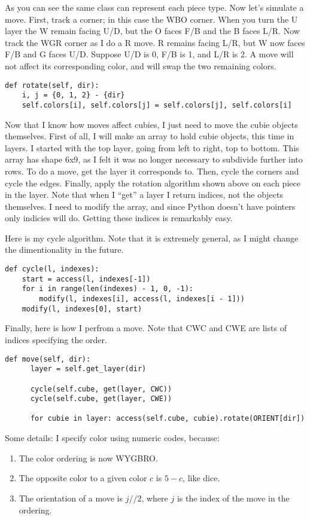 \documentclass[11pt, oneside]{article}
\begin{document}
As you can see the same class can represent each piece type. Now let's simulate a move. First, track a corner; in this case the WBO corner.
When you turn the U layer the W remain facing U/D, but the O faces F/B and the B faces L/R. Now track the WGR corner as I do a R move.
R remains facing L/R, but W now faces F/B and G faces U/D. Suppose U/D is 0, F/B is 1, and L/R is 2. A move will not affect its corresponding color, and will swap the two remaining colors.

\begin{verbatim}
def rotate(self, dir):
    i, j = {0, 1, 2} - {dir}
    self.colors[i], self.colors[j] = self.colors[j], self.colors[i]
\end{verbatim}

Now that I know how moves affect cubies, I just need to move the cubie objects themselves. First of all, I will make an array to hold cubie objects,
this time in layers. I started with the top layer, going from left to right, top to bottom.
This array has shape 6x9, as I felt it was no longer necessary to subdivide further into rows.
To do a move, get the layer it corresponds to. Then, cycle the corners and cycle the edges.
Finally, apply the rotation algorithm shown above on each piece in the layer.
Note that when I ``get'' a layer I return indices, not the objects themselves. I need to modify the array, and since Python doesn't have pointers
only indicies will do. Getting these indices is remarkably easy.

Here is my cycle algorithm. Note that it is extremely general, as I might change the dimentionality in the future.
\begin{verbatim}
def cycle(l, indexes):
    start = access(l, indexes[-1])
    for i in range(len(indexes) - 1, 0, -1):
        modify(l, indexes[i], access(l, indexes[i - 1]))
    modify(l, indexes[0], start)
\end{verbatim}

Finally, here is how I perfrom a move. Note that CWC and CWE are lists of indices specifying the order.
\begin{verbatim}
def move(self, dir):
      layer = self.get_layer(dir)

      cycle(self.cube, get(layer, CWC))
      cycle(self.cube, get(layer, CWE))

      for cubie in layer: access(self.cube, cubie).rotate(ORIENT[dir])
\end{verbatim}

Some details: I specify color using numeric codes, because:
\begin{enumerate}
  \item The color ordering is now WYGBRO.
  \item The opposite color to a given color \( c \) is \( 5 - c \), like dice.
  \item The orientation of a move is \( j//2 \), where \( j \) is the index of the move in the ordering.
\end{enumerate}
\end{document}
